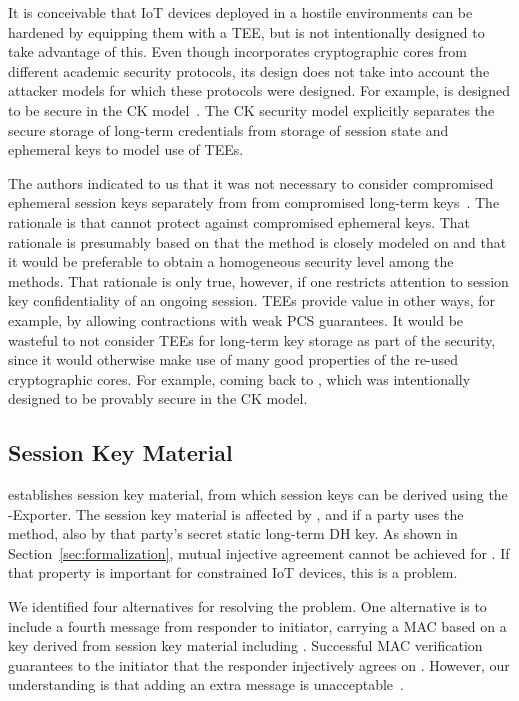 \documentclass[runningheads, envcountsame, a4paper, draft, x11names]{llncs}
\begin{document}
It is conceivable that IoT devices deployed in a hostile environments can be
hardened by equipping them with a TEE, but \mEdhoc{} is not intentionally
designed to take advantage of this.
%
Even though \mEdhoc{} incorporates cryptographic cores from different academic
security protocols, its design does not take into account the attacker models
for which these protocols were designed.
%
For example, \mOptls{} is designed to be secure in the CK
model~\cite{DBLP:conf/crypto/CanettiK02}.
%
The CK security model explicitly separates the secure storage of long-term
credentials from storage of session state and ephemeral keys to model
use of TEEs.
%

The \mEdhoc{} authors indicated to us that it was
not necessary to consider compromised ephemeral session keys separately from
from compromised long-term keys~\cite{personalCommunication}.
%
The rationale is that \mSigma{} cannot protect against compromised ephemeral
keys.
%
That rationale is presumably based on that the \mSigSig{} method is
closely modeled on \mSigmaI{} and that it would be preferable to obtain a
homogeneous security level among the \mEdhoc{}
methods\cite{personalCommunication}.
%
That rationale is only true, however, if one restricts attention to session key
confidentiality of an ongoing session.
%
TEEs provide value in other ways, for example, by allowing contractions with
weak PCS guarantees.
%
It would be wasteful to not consider TEEs for long-term key storage as part of
the security, since it would otherwise make use of many good properties of the
re-used cryptographic cores.
%
For example, coming back to \mOptls{}, which was intentionally
designed to be provably secure in the CK model.
%

\subsection{Session Key Material}
\label{sec:sessionKeyMaterial}
\mEdhoc{} establishes session key material, from which session keys
can be derived using the \mEdhoc{}-Exporter.
%
The session key material is affected by \mGxy{}, and if a party uses the
\mStat{} method, also by that party's secret static long-term DH key.
%
As shown in Section~\ref{sec:formalization}, mutual injective agreement cannot
be achieved for \mGiy{}.
%
If that property is important for constrained IoT devices, this is a problem.
%

We identified four alternatives for resolving the problem.
%
One alternative is to include a fourth message from responder to initiator,
carrying a MAC based on a key derived from session key
material including \mGiy{}.
%
Successful MAC verification guarantees
to the initiator that the responder injectively agrees on \mGiy{}.
%
However, our understanding is that adding an extra message is
unacceptable~\cite{personalCommunication}.
%
\end{document}
